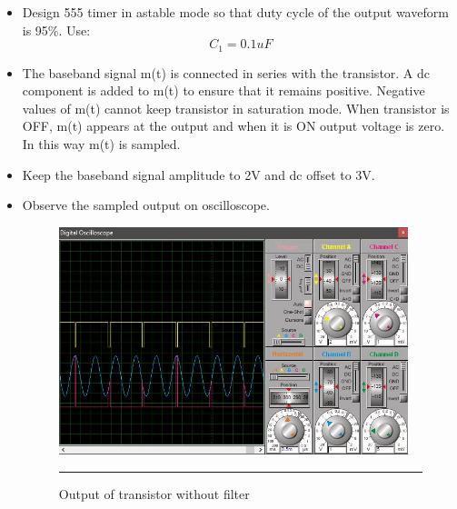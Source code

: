 \begin{itemize}
    \item Design 555 timer in astable mode so that duty cycle of the output waveform is 95\%. Use:
    \[C_1=0.1uF\]

    \item	The baseband signal m(t) is connected in series with the transistor. A dc component is added to m(t) to ensure that it remains positive. Negative values of m(t) cannot keep transistor in saturation mode. When transistor is OFF, m(t) appears at the output and when it is ON output voltage is zero. In this way m(t) is sampled.

    \item Keep the baseband signal amplitude to 2V and dc offset to 3V.

    \item Observe the sampled output on oscilloscope.
    \begin{figure}[htbp]
	    \centering
	    \includegraphics[width = 4in]{./Figures/general-output.jpg}
	    \rule{35em}{0.5pt}
	    \caption{Output of transistor without filter}
    \end{figure}
    
\end{itemize}

